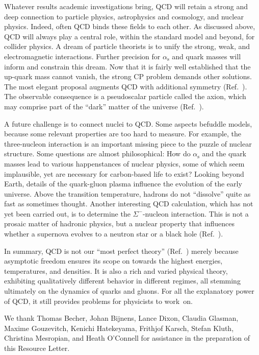 \documentclass[prb,groupedaddress,nofootinbib,showpacs,twocolumn,floatfix]{revtex4}
\newcommand{\alphas}{\ensuremath{\alpha_{\mathrm{s}}}}
\begin{document}
Whatever results academic investigations bring, QCD will retain a 
strong and deep connection to particle physics, astrophysics and 
cosmology, and nuclear physics.
Indeed, often QCD binds these fields to each other.
As discussed above, QCD will always play a central role, within the 
standard model and beyond, for collider physics.
A dream of particle theorists is to unify the strong, weak, and 
electromagnetic interactions.
Further precision for $\alphas$ and quark masses will inform and 
constrain this dream.
Now that it is fairly well established that the up-quark mass cannot 
vanish, the strong CP problem demands other solutions.
The most elegant proposal augments QCD with additional 
symmetry (Ref.~).
The observable consequence is a pseudoscalar particle called the axion, 
which may comprise part of the ``dark'' matter of the 
universe (Ref.~).

A future challenge is to connect nuclei to QCD.
Some aspects befuddle models, because some relevant properties are too 
hard to measure.
For example, the three-nucleon interaction is an important missing 
piece to the puzzle of nuclear structure.
Some questions are almost philosophical:
How do $\alphas$ and the quark masses lead to various 
happenstances of nuclear physics, some of which seem implausible, yet 
are necessary for carbon-based life to exist?
Looking beyond Earth, details of the quark-gluon plasma influence the 
evolution of the early universe.
Above the transition temperature, hadrons do not ``dissolve'' quite as 
fast as sometimes thought.
Another interesting QCD calculation, which has not yet been carried out, 
is to determine the $\Sigma^-$-nucleon interaction.
This is not a prosaic matter of hadronic physics, but a nuclear 
property that influences whether a supernova evolves to a neutron star 
or a black hole (Ref.~).

In summary, QCD is not our ``most perfect theory'' 
(Ref.~) merely because asymptotic freedom 
ensures its scope on towards the highest energies, temperatures, and 
densities.
It is also a rich and varied physical theory, exhibiting qualitatively 
different behavior in different regimes, all stemming ultimately on the 
dynamics of quarks and gluons.
For all the explanatory power of QCD, it still provides problems for 
physicists to work~on.

\acknowledgments

We thank 
Thomas Becher,
Johan Bijnens,
Lance Dixon,
Claudia Glasman,
Maxime Gouzevitch,
Kenichi Hatekeyama,
Frithjof Karsch,
Stefan Kluth,
Christina Mesropian,
and
Heath O'Connell
for assistance in the preparation of this Resource Letter.
\end{document}
